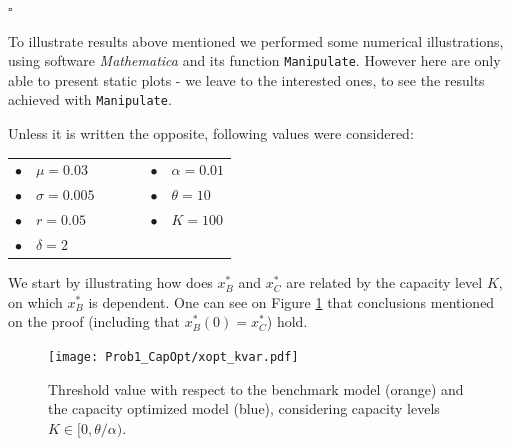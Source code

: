  
 
 
\begin{flushright}
 $\square$
\end{flushright}



To illustrate results above mentioned we performed some numerical illustrations, using software \textit{Mathematica} and its function \texttt{Manipulate}. However here are only able to present static plots - we leave to the interested ones, to see the results achieved with \texttt{Manipulate}.

Unless it is written the opposite, following values were considered:


\begin{table}[!htb]
	\centering
	\begin{tabular}{lllllll}
		 $\bullet$ & $\mu=0.03$     &  & \hspace{7cm} &  &  $\bullet$ & $\alpha=0.01$ \\
		 $\bullet$ & $\sigma=0.005$ &  & \hspace{7cm} &  &  $\bullet$ & $\theta=10$   \\
		 $\bullet$ & $r=0.05$       &  & \hspace{7cm} &  &  $\bullet$ & $K=100$       \\
		 $\bullet$ & $\delta=2$     &  & \hspace{7cm} &  &                                    
	\end{tabular}
\end{table}



We start by illustrating how does $x^*_B$ and $x^*_C$ are related by the capacity level $K$, on which $x^*_B$ is dependent. One can see on Figure \ref{fig:Kvar} that conclusions mentioned on the proof (including that $x^*_B(0)=x^*_C$) hold.

\begin{figure}[!htb]
	\centering
	\texttt{[image: Prob1\_CapOpt/xopt\_kvar.pdf]}
	\caption{Threshold value with respect to the benchmark model (orange) and the capacity optimized model (blue), considering capacity levels $K \in [0, \theta/\alpha)$.}
	\label{fig:Kvar}
\end{figure}


